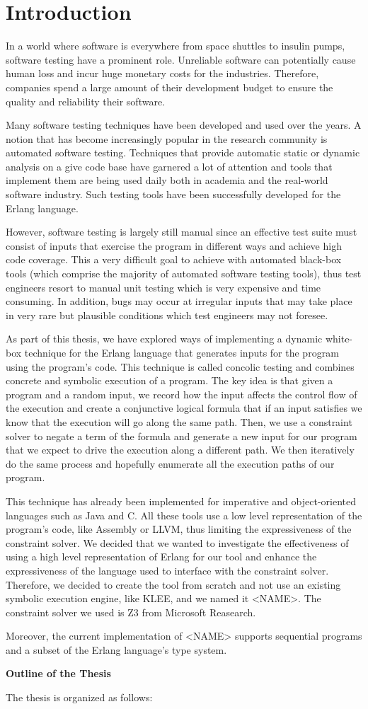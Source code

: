 \chapter{Introduction}\label{ch:introduction}

In a world where software is everywhere from space shuttles to insulin pumps,
software testing have a prominent role. Unreliable software can potentially
cause human loss and incur huge monetary costs for the industries. Therefore,
companies spend a large amount of their development budget to ensure the quality
and reliability their software.

Many software testing techniques have been developed and used over the years. A
notion that has become increasingly popular in the research community is
automated software testing. Techniques that provide automatic static or dynamic
analysis on a give code base have garnered a lot of attention and tools that
implement them are being used daily both in academia and the real-world
software industry. Such testing tools have been successfully developed for the
Erlang language.

However, software testing is largely still manual since an effective test suite
must consist of inputs that exercise the program in different ways and achieve
high code coverage. This a very difficult goal to achieve with automated
black-box tools (which comprise the majority of automated software testing
tools), thus test engineers resort to manual unit testing which is very
expensive and time consuming. In addition, bugs may occur at irregular inputs
that may take place in very rare but plausible conditions which test engineers
may not foresee.

As part of this thesis, we have explored ways of implementing a dynamic
white-box technique for the Erlang language that generates inputs for the
program using the program’s code. This technique is called concolic testing and
combines concrete and symbolic execution of a program. The key idea is that
given a program and a random input, we record how the input affects the control
flow of the execution and create a conjunctive logical formula that if an input
satisfies we know that the execution will go along the same path. Then, we use
a constraint solver to negate a term of the formula and generate a new input
for our program that we expect to drive the execution along a different path.
We then iteratively do the same process and hopefully enumerate all the
execution paths of our program.

This technique has already been implemented for imperative and object-oriented
languages such as Java and C. All these tools use a low level representation of
the program’s code, like Assembly or LLVM, thus limiting the expressiveness of
the constraint solver. We decided that we wanted to investigate the
effectiveness of using a high level representation of Erlang for our tool and
enhance the expressiveness of the language used to interface with the
constraint solver. Therefore, we decided to create the tool from scratch and
not use an existing symbolic execution engine, like KLEE, and we named it
<NAME>. The constraint solver we used is Z3 from Microsoft Reasearch.

Moreover, the current implementation of <NAME> supports sequential programs and
a subset of the Erlang language’s type system.

\textbf{Outline of the Thesis}

The thesis is organized as follows:
